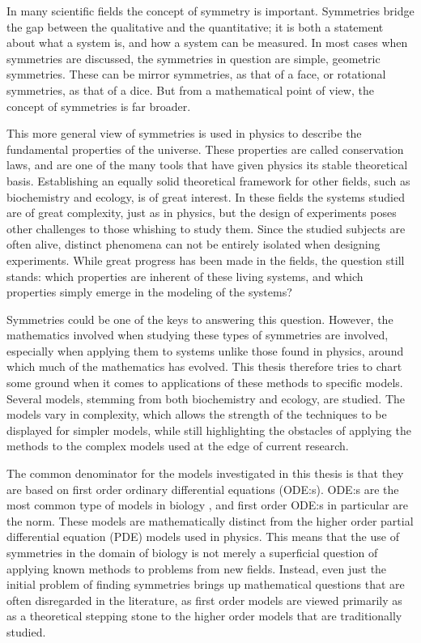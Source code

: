 
In many scientific fields the concept of symmetry is important.
Symmetries bridge the gap between the qualitative and the quantitative; it is both a statement about what a system is, and how a system can be measured.
In most cases when symmetries are discussed, the symmetries in question are simple, geometric symmetries.
These can be mirror symmetries, as that of a face, or rotational symmetries, as that of a dice.
But from a mathematical point of view, the concept of symmetries is far broader.

This more general view of symmetries is used in physics to describe the fundamental properties of the universe.
These properties are called conservation laws, and are one of the many tools that have given physics its stable theoretical basis.
Establishing an equally solid theoretical framework for other fields, such as biochemistry and ecology, is of great interest.
In these fields the systems studied are of great complexity, just as in physics, but the design of experiments poses other challenges to those whishing to study them.
Since the studied subjects are often alive, distinct phenomena can not be entirely isolated when designing experiments.
While great progress has been made in the fields, the question still stands: which properties are inherent of these living systems, and which properties simply emerge in the modeling of the systems?

Symmetries could be one of the keys to answering this question.
However, the mathematics involved when studying these types of symmetries are involved, especially when applying them to systems unlike those found in physics, around which much of the mathematics has evolved.
This thesis therefore tries to chart some ground when it comes to applications of these methods to specific models.
Several models, stemming from both biochemistry and ecology, are studied.
The models vary in complexity, which allows the strength of the techniques to be displayed for simpler models, while still highlighting the obstacles of applying the methods to the complex models used at the edge of current research.

The common denominator for the models investigated in this thesis is that they are based on first order ordinary differential equations (ODE:s).
ODE:s are the most common type of models in biology \cite{maliksheriff2020biomodels,biomodels}, and first order ODE:s in particular are the norm.
These models are mathematically distinct from the higher order partial differential equation (PDE) models used in physics.
This means that the use of symmetries in the domain of biology is not merely a superficial question of applying known methods to problems from new fields.
Instead, even just the initial problem of finding symmetries brings up mathematical questions that are often disregarded in the literature, as first order models are viewed primarily as as a theoretical stepping stone to the higher order models that are traditionally studied.

